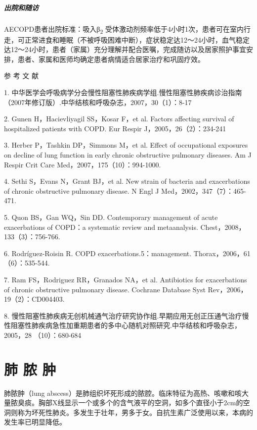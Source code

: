 \paragraph{出院和随访}

AECOPD患者出院标准：吸入β\textsubscript{2}
受体激动剂频率低于4小时1次，患者可在室内行走，可正常进食和睡眠（不被呼吸困难中断），症状稳定达12～24小时，血气稳定达12～24小时，患者（家属）充分理解并配合医嘱，完成随访以及居家照护事宜安排，患者、家属和医师均确定患者病情适合居家治疗和巩固疗效。

\protect\hypertarget{text00275.html}{}{}

\hypertarget{text00275.htmlux5cux23CHP9-6-4}{}
参 考 文 献

1.
中华医学会呼吸病学分会慢性阻塞性肺疾病学组.慢性阻塞性肺疾病诊治指南（2007年修订版）.中华结核和呼吸杂志，2007，30（1）：8-17

2. Gunen H，Hacievliyagil SS，Kosar F，et al. Factors affecting survival
of hospitalized patients with COPD. Eur Respir J，2005，26（2）：234-241

3. Herber P，Tashkin DP，Simmons M，et al. Effect of occupational
exposures on decline of lung function in early chronic obstructive
pulmonary diseases. Am J Respir Crit Care
Med，2007，175（10）：994-1000.

4. Sethi S，Evans N，Grant BJ，et al. New strain of bacteria and
exacerbations of chronic obstructive pulmonary disease. N Engl J
Med，2002，347（7）：465-471.

5. Quon BS，Gan WQ，Sin DD. Contemporary management of acute
exacerbations of COPD：a systematic review and metaanalysis.
Chest，2008，133（3）：756-766.

6. Rodríguez-Roisin R. COPD exacerbations.5：management.
Thorax，2006，61（6）：535-544.

7. Ram FS，Rodriguez RR，Granados NA，et al. Antibiotics for
exacerbations of chronic obstructive pulmonary disease. Cochrane
Database Syst Rev，2006，19（2）：CD004403.

8.
慢性阻塞性肺疾病无创机械通气治疗研究协作组.早期应用无创正压通气治疗慢性阻塞性肺疾病急性加重期患者的多中心随机对照研究.中华结核和呼吸杂志，2005，28
（10）：680-684

\protect\hypertarget{text00276.html}{}{}

\chapter{肺 脓 肿}

肺脓肿（lung
abscess）是肺组织坏死形成的脓腔。临床特征为高热、咳嗽和咳大量脓臭痰。胸部X线显示一个或多个的含气液平的空洞，如多个直径小于2cm的空洞则称为坏死性肺炎。多发生于壮年，男多于女。自抗生素广泛使用以来，本病的发生率已明显降低。

